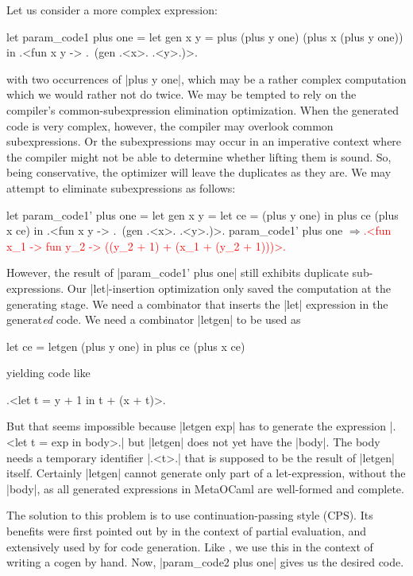 \documentclass{elsart}
\newcommand{\evalresult}[1]{\ensuremath{\Longrightarrow}\textcolor{red}{#1}}
\begin{document}
Let us consider a more complex expression:
\begin{code}
let param_code1 plus one =
  let gen x y = plus (plus y one) (plus x (plus y one)) in
  .<fun x y -> .~(gen .<x>. .<y>.)>.
\end{code}
with two occurrences of |plus y one|,
which may be a rather complex computation which we would rather not do
twice. We may be tempted to rely on the compiler's
common-subexpression elimination optimization. When the generated code is
very complex, however, the compiler may overlook common subexpressions.  Or the
subexpressions may occur in an imperative context where the compiler
might not be able to determine whether lifting them is sound. So, being
conservative, the optimizer will leave the duplicates as they are. 
We may attempt to eliminate subexpressions as follows: 
\begin{code}
let param_code1' plus one =
  let gen x y = let ce = (plus y one) in  plus ce (plus x ce) in
  .<fun x y -> .~(gen .<x>. .<y>.)>.
param_code1' plus one
\evalresult{.<fun x_1 -> fun y_2 -> ((y_2 + 1) + (x_1 + (y_2 + 1)))>.}
\end{code}
However,
the result of |param_code1' plus one| still exhibits duplicate
sub-expressions.  Our |let|-insertion optimization only saved the
computation at the generating stage.  We need a combinator that
inserts the |let| expression in the generat\emph{ed} code. We need a
combinator |letgen| to be used as
\begin{code}
let ce = letgen (plus y one) in plus ce (plus x ce)
\end{code}
yielding code like 
\begin{code}
.<let t = y + 1 in t + (x + t)>.
\end{code}
But that seems impossible because |letgen exp| has to generate
the expression |.<let t = exp in body>.| but |letgen| does not yet
have the |body|. The body needs a temporary identifier |.<t>.|
that is supposed to be the result of |letgen| itself.  Certainly
|letgen| cannot generate only part of a let-expression, without the
|body|, as all generated expressions in MetaOCaml are well-formed and
complete.

The solution to this problem is to use continuation-passing style (CPS). Its
benefits were first pointed out by \cite{Bondorf:92} in the context of partial
evaluation, and extensively used by \cite{SwadiMonadic06,KiselyovTaha} for
code generation. Like \cite{conf/pepm/BondorfD94}, we use this in the 
context of writing a cogen by hand.  Now, |param_code2 plus one| gives us the
desired code.
\end{document}
